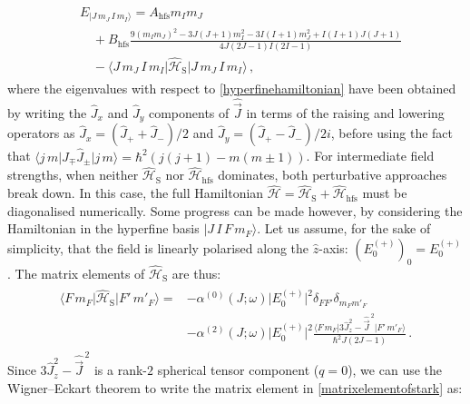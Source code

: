 \documentclass[../Thesis-IJspeert.tex]{subfiles}
\begin{document}
\begin{align}
\begin{split}
	&E_{\vert J\, m_J\, I\, m_I\rangle}= A_{\mathrm{hfs}} m_I m_J \\&\hspace{1em}+B_{\mathrm{hfs}}\frac{9(m_I m_J)^2-3J(J+1)m_I^2 - 3I(I+1)m_J^2 + I(I+1)J(J+1)}{4J(2J-1)I(2I-1)} \\&\hspace{1em}- \langle J\, m_J\, I\, m_I \vert \hat{\mathcal{H}}_{\mathrm{S}} \vert J\, m_J\, I\, m_I\rangle \,,
\end{split}
\end{align}
where the eigenvalues with respect to \autoref{hyperfinehamiltonian} have been obtained by writing the $\hat{J}_x$ and $\hat{J}_y$ components of $\hat{\vec{J}}$ in terms of the raising and lowering operators as $\hat{J}_x=(\hat{J}_+ + \hat{J}_-)/2$ and $\hat{J}_y=(\hat{J}_+ - \hat{J}_-)/2i$, before using the fact that $\langle j\, m \vert \hat{J}_\mp \hat{J}_\pm \vert j\, m \rangle = \hbar^2\left( j(j+1) - m(m\pm1)\right)$. For intermediate field strengths, when neither $\hat{\mathcal{H}}_\mathrm{S}$ nor $\hat{\mathcal{H}}_\mathrm{hfs}$ dominates, both perturbative approaches break down. In this case, the full Hamiltonian $\hat{\mathcal{H}}=\hat{\mathcal{H}}_\mathrm{S}+\hat{\mathcal{H}}_\mathrm{hfs}$ must be diagonalised numerically. Some progress can be made however, by considering the Hamiltonian in the hyperfine basis $\vert J\, I\, F\, m_F\rangle$. Let us assume, for the sake of simplicity, that the field is linearly polarised along the $\hat{z}$-axis: $(E_0^{(+)})_0=E_0^{(+)}$. The matrix elements of $\hat{\mathcal{H}}_\mathrm{S}$ are thus:
\begin{align}
\label{matrixelementofstark}
\begin{split}
\langle F\,m_F \vert \hat{\mathcal{H}}_\mathrm{S} \vert F'\, m'_F \rangle = &- \alpha^{(0)}\left(J;\omega\right) \lvert E_0^{(+)}\rvert ^2 \delta_{FF'}\delta_{m_F m'_F} \\&- \alpha^{(2)}\left(J;\omega\right) \lvert E_0^{(+)}\rvert ^2 \frac{ \langle F\,m_F \vert 3{\hat{J}}_z^2-\hat{\vec{J}}^{\,2}  \vert F'\, m'_F \rangle }{\hbar^2 J\left(2J-1\right)} \,.
\end{split}
\end{align}
Since $3{\hat{J}}_z^2-\hat{\vec{J}}^{\,2}$ is a rank-$2$ spherical tensor component ($q=0$), we can use the Wigner--Eckart theorem to write the matrix element in \autoref{matrixelementofstark} as:
\end{document}
